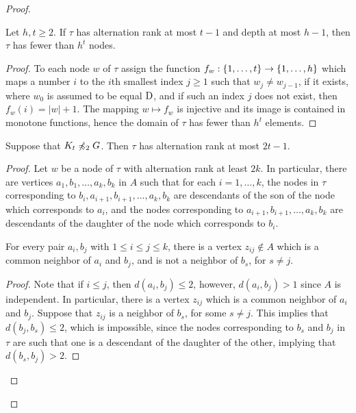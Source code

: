 \begin{proof}
\begin{lemma}\label{lem:number-of-nodes}
Let $h,t\ge 2$.	If $\tau$ has alternation rank at most $t-1$ and depth at most $h-1$, then $\tau$ has fewer than $h^{t}$
	nodes.
\end{lemma}
\begin{proof}		
	To each node $w$ of $\tau$ assign 
	the function $f_w:\{1,\ldots,t\}\to\{1,\ldots,h\}$ which
	maps a number $i$ to the $i$th smallest index $j\ge 1$
	such that $w_j\neq w_{j-1}$, if it exists, 
	where $w_0$ is assumed to be equal $\mathrm{D}$,
	and if such an index $j$ does not exist, then $f_w(i)=|w|+1$.
		The mapping $w\mapsto f_w$ is injective
and its image is contained in monotone functions, hence the domain of $\tau$ 
		has fewer than $h^{t}$ elements.
\end{proof}

\begin{lemma}\label{thm:alternation-rank-type-tree}
Suppose that  $K_t\not\preccurlyeq_{2} G$.
Then $\tau$ has alternation rank at most $2t-1$.
\end{lemma}
\begin{proof}
	Let $w$ be a node of $\tau$ with alternation rank at least $2k$.  
	In particular, there are vertices $a_1,b_1,\ldots,a_k,b_k$ in $A$
	such that for each $i=1,\ldots,k$, 
	the nodes in $\tau$ corresponding to $b_i,a_{i+1},b_{i+1},\ldots,a_k,b_k$ are  descendants of the son of the node which corresponds to $a_i$,
	and the nodes corresponding to $a_{i+1},b_{i+1},\ldots,a_k,b_k$
	are descendants of the daughter of the node which corresponds to $b_i$.
	
	\begin{claim}\label{claim:minor}
		For every pair $a_i,b_j$ with $1\le i\le j\le k$, there is a vertex $z_{ij}\not\in A$		which is a common neighbor of $a_i$ and $b_j$,
		and is not a neighbor of $b_s$, for $s\neq j$.
	\end{claim}
	\begin{proof}
		Note that if $i\le j$, then $d(a_i,b_j)\le 2$, however, $d(a_i,b_j)>1$ since $A$
		is independent. In particular, there is a vertex $z_{ij}$ which is a common neighbor of $a_i$ and $b_j$. 
		Suppose that $z_{ij}$ is a neighbor of $b_s$, for some $s\neq j$. This implies that $d(b_j,b_s)\le 2$, which is impossible, 
since
		 the nodes corresponding to $b_s$ and $b_j$ in $\tau$ are such that one is a descendant of the daughter of the other, implying that $d(b_s,b_j)>2$.
	\end{proof}
  



\end{proof}
\end{proof}
